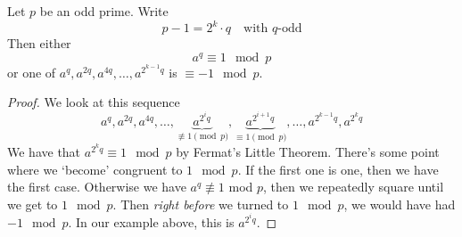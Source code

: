 \begin{proposition}\label{prop:aq-1-mod-p}
    Let $p$ be an odd prime. Write
    \[p-1 = 2^k\cdot q\quad\text{with $q$-odd}\]
    Then either
    \[a^{q}\equiv 1\mod p\]
    or one of $a^q, a^{2q}, a^{4q},\dots, a^{2^{k-1}q}$ is $\equiv -1\mod p$.
\end{proposition}
\begin{proof}
    We look at this sequence
    \[a^q, a^{2q}, a^{4q},\dots, \underbrace{a^{2^iq}}_{\not\equiv 1\pmod p}, \underbrace{a^{2^{i+1}q}}_{\equiv 1\pmod p}, \dots, a^{2^{k-1}q}, a^{2^kq}\]
    We have that $a^{2^kq}\equiv 1\mod p$ by Fermat's Little Theorem. There's some point where we `become' congruent to $1\mod p$. If the first one is one, then we have the first case. Otherwise we have $a^q\not\equiv 1$ mod $p$, then we repeatedly square until we get to $1\mod p$. Then \emph{right before} we turned to $1\mod p$, we would have had $-1\mod p$. In our example above, this is $a^{2^iq}$. 
\end{proof}
